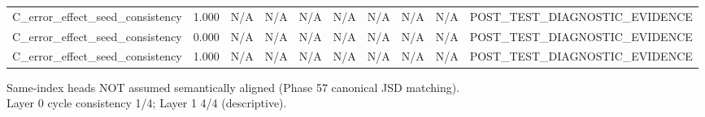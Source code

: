 \begin{table}[h!]
\begin{tabular}{lrrrrrrrrr}
C\_error\_effect\_seed\_consistency & 1.000 & N/A & N/A & N/A & N/A & N/A & N/A & N/A & POST\_TEST\_DIAGNOSTIC\_EVIDENCE \\
C\_error\_effect\_seed\_consistency & 0.000 & N/A & N/A & N/A & N/A & N/A & N/A & N/A & POST\_TEST\_DIAGNOSTIC\_EVIDENCE \\
C\_error\_effect\_seed\_consistency & 1.000 & N/A & N/A & N/A & N/A & N/A & N/A & N/A & POST\_TEST\_DIAGNOSTIC\_EVIDENCE \\
\bottomrule
\end{tabular}
\vspace{4pt}
\footnotesize{Same-index heads NOT assumed semantically aligned (Phase 57 canonical JSD matching).}\\
\footnotesize{Layer 0 cycle consistency 1/4; Layer 1 4/4 (descriptive).}\\
\end{table}
